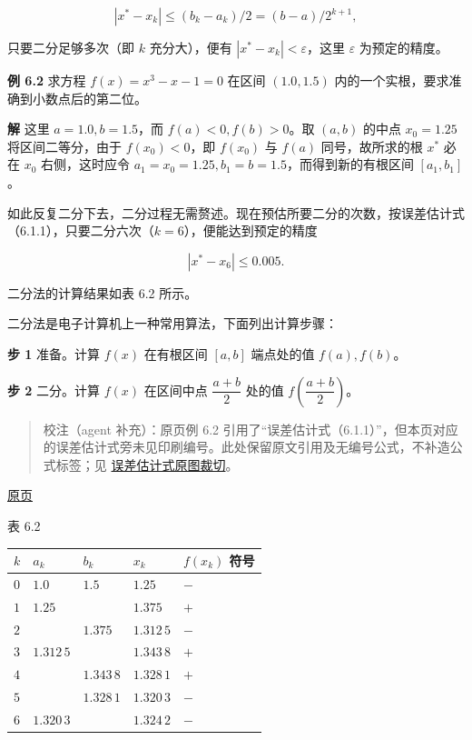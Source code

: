 \documentclass[
  10pt,
  fontset=fandol]{ctexart}
\newcounter{none} %
\begin{document}
\[
|x^*-x_k|\leqslant(b_k-a_k)/2=(b-a)/2^{k+1},
\]

只要二分足够多次（即 \(k\) 充分大），便有 \(|x^*-x_k|<\varepsilon\)，这里 \(\varepsilon\) 为预定的精度。

\textbf{例 6.2} 求方程 \(f(x)=x^3-x-1=0\) 在区间 \((1.0,1.5)\) 内的一个实根，要求准确到小数点后的第二位。

\textbf{解} 这里 \(a=1.0,b=1.5\)，而 \(f(a)<0,f(b)>0\)。取 \((a,b)\) 的中点 \(x_0=1.25\) 将区间二等分，由于 \(f(x_0)<0\)，即 \(f(x_0)\) 与 \(f(a)\) 同号，故所求的根 \(x^*\) 必在 \(x_0\) 右侧，这时应令 \(a_1=x_0=1.25,b_1=b=1.5\)，而得到新的有根区间 \([a_1,b_1]\)。

如此反复二分下去，二分过程无需赘述。现在预估所要二分的次数，按误差估计式（6.1.1），只要二分六次（\(k=6\)），便能达到预定的精度

\[
|x^*-x_6|\leqslant0.005.
\]

二分法的计算结果如表 6.2 所示。

二分法是电子计算机上一种常用算法，下面列出计算步骤：

\textbf{步 1} 准备。计算 \(f(x)\) 在有根区间 \([a,b]\) 端点处的值 \(f(a),f(b)\)。

\textbf{步 2} 二分。计算 \(f(x)\) 在区间中点 \(\dfrac{a+b}{2}\) 处的值 \(f\left(\dfrac{a+b}{2}\right)\)。

\begin{quote}
校注（agent 补充）：原页例 6.2 引用了``误差估计式（6.1.1）''，但本页对应的误差估计式旁未见印刷编号。此处保留原文引用及无编号公式，不补造公式标签；见 \href{../assets/ch06/detail-p156-audit.png}{误差估计式原图裁切}。
\end{quote}

\href{../../source-images/pdf-157.jpeg}{原页}

表 6.2

{\def\LTcaptype{none} %
\begin{longtable}[]{@{}lllll@{}}
\toprule\noalign{}
\(k\) & \(a_k\) & \(b_k\) & \(x_k\) & \(f(x_k)\) 符号 \\
\midrule\noalign{}
\endhead
\bottomrule\noalign{}
\endlastfoot
\(0\) & \(1.0\) & \(1.5\) & \(1.25\) & \(-\) \\
\(1\) & \(1.25\) & & \(1.375\) & \(+\) \\
\(2\) & & \(1.375\) & \(1.312\,5\) & \(-\) \\
\(3\) & \(1.312\,5\) & & \(1.343\,8\) & \(+\) \\
\(4\) & & \(1.343\,8\) & \(1.328\,1\) & \(+\) \\
\(5\) & & \(1.328\,1\) & \(1.320\,3\) & \(-\) \\
\(6\) & \(1.320\,3\) & & \(1.324\,2\) & \(-\) \\
\end{longtable}
}
\end{document}
